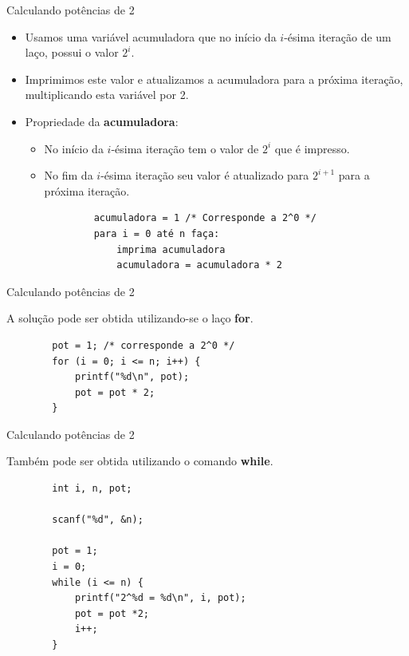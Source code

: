 \documentclass[handout]{beamer}
\begin{document}
\begin{frame}[fragile]{Calculando potências de 2}

    \begin{itemize}
        \item Usamos uma variável acumuladora que no início da $i$-ésima iteração de um laço, possui o valor $2^i$.
        \item Imprimimos este valor e atualizamos a acumuladora para a próxima iteração, multiplicando esta variável por 2.
        \item Propriedade da {\bf acumuladora}:
            \begin{itemize}
                \item No início da $i$-ésima iteração tem o valor de $2^i$ que é impresso.
                \item No fim  da $i$-ésima iteração seu valor é atualizado para $2^{i+1}$ para a próxima iteração.
            \end{itemize}

        \begin{verbatim}
            acumuladora = 1 /* Corresponde a 2^0 */
            para i = 0 até n faça:
                imprima acumuladora
                acumuladora = acumuladora * 2
        \end{verbatim}
    \end{itemize}
\end{frame}

\begin{frame}[fragile]{Calculando potências de 2}

    A solução pode ser obtida utilizando-se o laço {\bf for}.
        
    \begin{verbatim}
        pot = 1; /* corresponde a 2^0 */
        for (i = 0; i <= n; i++) {
            printf("%d\n", pot);
            pot = pot * 2;
        }
    \end{verbatim}
\end{frame}

\begin{frame}[fragile]{Calculando potências de 2}

    Também pode ser obtida utilizando o comando {\bf while}.

    \begin{verbatim}
        int i, n, pot;

        scanf("%d", &n);
        
        pot = 1;
        i = 0;
        while (i <= n) {
            printf("2^%d = %d\n", i, pot);
            pot = pot *2;
            i++;
        }
    \end{verbatim}
\end{frame}
\end{document}
